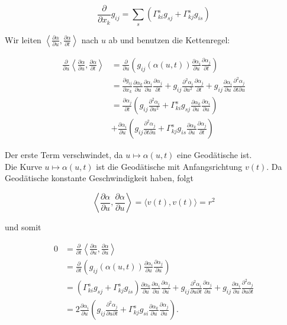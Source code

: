 \documentclass[10pt, letterpaper]{article}
\begin{document}
$$
\frac{\partial}{\partial x_{k}} g_{i j}=\sum_{s}\left(\Gamma_{k i}^{s} g_{s j}+\Gamma_{k j}^{s} g_{i s}\right)
$$

Wir leiten $\left\langle\frac{\partial \alpha}{\partial u}, \frac{\partial \alpha}{\partial t}\right\rangle$ nach $u$ ab und benutzen die Kettenregel:

$$
\begin{aligned}
\frac{\partial}{\partial u}\left\langle\frac{\partial \alpha}{\partial u}, \frac{\partial \alpha}{\partial t}\right\rangle & =\frac{\partial}{\partial u}\left(g_{i j}(\alpha(u, t)) \frac{\partial \alpha_{i}}{\partial u} \frac{\partial \alpha_{j}}{\partial t}\right) \\
& =\frac{\partial g_{i j}}{\partial x_{k}} \frac{\partial \alpha_{k}}{\partial u} \frac{\partial \alpha_{i}}{\partial u} \frac{\partial \alpha_{j}}{\partial t}+g_{i j} \frac{\partial^{2} \alpha_{i}}{\partial u^{2}} \frac{\partial \alpha_{j}}{\partial t}+g_{i j} \frac{\partial \alpha_{i}}{\partial u} \frac{\partial^{2} \alpha_{j}}{\partial t \partial u} \\
& =\frac{\partial \alpha_{j}}{\partial t}\left(g_{i j} \frac{\partial^{2} \alpha_{i}}{\partial u^{2}}+\Gamma_{k i}^{s} g_{s j} \frac{\partial \alpha_{k}}{\partial u} \frac{\partial \alpha_{i}}{\partial u}\right) \\
& +\frac{\partial \alpha_{i}}{\partial u}\left(g_{i j} \frac{\partial^{2} \alpha_{j}}{\partial t \partial u}+\Gamma_{k j}^{s} g_{i s} \frac{\partial \alpha_{k}}{\partial u} \frac{\partial \alpha_{j}}{\partial t}\right)
\end{aligned}
$$

Der erste Term verschwindet, da $u \mapsto \alpha(u, t)$ eine Geodätische ist.\\
Die Kurve $u \mapsto \alpha(u, t)$ ist die Geodätische mit Anfangsrichtung $v(t)$. Da Geodätische konstante Geschwindigkeit haben, folgt

$$
\left\langle\frac{\partial \alpha}{\partial u}, \frac{\partial \alpha}{\partial u}\right\rangle=\langle v(t), v(t)\rangle=r^{2}
$$

und somit

$$
\begin{aligned}
0 & =\frac{\partial}{\partial t}\left\langle\frac{\partial \alpha}{\partial u}, \frac{\partial \alpha}{\partial u}\right\rangle \\
& =\frac{\partial}{\partial t}\left(g_{i j}(\alpha(u, t)) \frac{\partial \alpha_{i}}{\partial u} \frac{\partial \alpha_{j}}{\partial u}\right) \\
& =\left(\Gamma_{k i}^{s} g_{s j}+\Gamma_{k j}^{s} g_{i s}\right) \frac{\partial \alpha_{k}}{\partial u} \frac{\partial \alpha_{i}}{\partial u} \frac{\partial \alpha_{j}}{\partial u}+g_{i j} \frac{\partial^{2} \alpha_{i}}{\partial u \partial t} \frac{\partial \alpha_{j}}{\partial u}+g_{i j} \frac{\partial \alpha_{i}}{\partial u} \frac{\partial^{2} \alpha_{j}}{\partial u \partial t} \\
& =2 \frac{\partial \alpha_{i}}{\partial u}\left(g_{i j} \frac{\partial^{2} \alpha_{j}}{\partial u \partial t}+\Gamma_{k j}^{s} g_{s i} \frac{\partial \alpha_{k}}{\partial u} \frac{\partial \alpha_{j}}{\partial u}\right) .
\end{aligned}
$$
\end{document}
